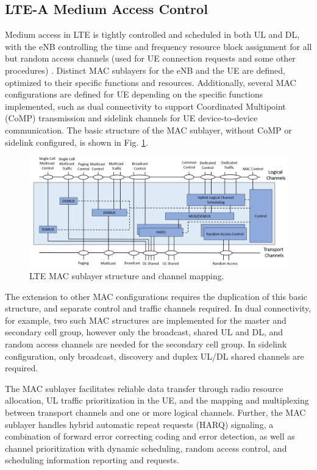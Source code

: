 \subsection{LTE-A Medium Access Control}
\label{lte-mac}
Medium access in LTE is tightly controlled and scheduled in both UL and DL, with the eNB controlling the time and frequency resource block assignment for all but random access channels (used for UE connection requests and some other procedures) \cite{tr36321}.  Distinct MAC sublayers for the eNB and the UE are defined, optimized to their specific functions and resources.  Additionally, several MAC configurations are defined for UE depending on the specific functions implemented, such as dual connectivity to support Coordinated Multipoint (CoMP) transmission and sidelink channels for UE device-to-device communication. The basic structure of the MAC sublayer, without CoMP or sidelink configured, is shown in Fig. \ref{figs:lte-mac}.
\begin{figure}[!ht]
	\centering
	\includegraphics[width=\textwidth]{figures3/LTE-MAC}	
	\caption{LTE MAC sublayer structure and channel mapping.}
	\label{figs:lte-mac}
\end{figure}
The extension to other MAC configurations requires the duplication of this basic structure, and separate control and traffic channels required. In dual connectivity, for example, two such MAC structures are implemented for the master and secondary cell group, however only the broadcast, shared UL and DL, and random access channels are needed for the secondary cell group.  In sidelink configuration, only broadcast, discovery and duplex UL/DL shared channels are required.

The MAC sublayer facilitates reliable data transfer through radio resource allocation, UL traffic prioritization in the UE, and the mapping and multiplexing between transport channels and one or more logical channels. Further, the MAC sublayer handles hybrid automatic repeat requests (HARQ) signaling, a combination of forward error correcting coding and error detection, as well as channel prioritization with dynamic scheduling, random access control, and scheduling information reporting and requests.

